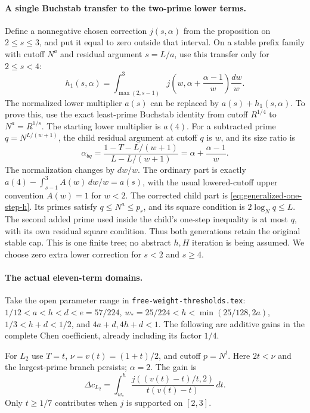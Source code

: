 \documentclass[11pt]{article}
\begin{document}
\paragraph{A single Buchstab transfer to the two-prime lower terms.}
Define a nonnegative chosen correction $j(s,\alpha)$ from the
proposition on $2\le s\le3$, and put it equal to zero outside that
interval. On a stable prefix family with cutoff $N^a$ and residual
argument $s=L/a$, use this transfer only for $2\le s<4$:
\begin{equation}\label{eq:generalized-one-step-h}
 h_1(s,\alpha)=\int_{\max(2,s-1)}^3
 j\left(w,\alpha+\frac{\alpha-1}{w}\right)\frac{dw}{w}.
\end{equation}
The normalized lower multiplier $a(s)$ can be replaced by
$a(s)+h_1(s,\alpha)$. To prove this, use the exact least-prime
Buchstab identity from cutoff $R^{1/4}$ to $N^a=R^{1/s}$.
The starting lower multiplier is $a(4)$. For a subtracted prime
$q=N^{L/(w+1)}$, the child residual argument at cutoff $q$ is $w$,
and its size ratio is
\[
 \alpha_{bq}=\frac{1-T-L/(w+1)}{L-L/(w+1)}
            =\alpha+\frac{\alpha-1}{w}.
\]
The normalization changes by $dw/w$. The ordinary part is exactly
$a(4)-\int_{s-1}^3 A(w)\,dw/w=a(s)$, with the usual lowered-cutoff
upper convention $A(w)=1$ for $w<2$. The corrected child part is
\eqref{eq:generalized-one-step-h}. Its primes satisfy
$q\le N^a\le p_r$, and its square condition is $2\log_Nq\le L$.
The second added prime used inside the child's one-step inequality
is at most $q$, with its own residual square condition. Thus both
generations retain the original stable cap. This is one finite tree;
no abstract $h,H$ iteration is being assumed. We choose zero extra
lower correction for $s<2$ and $s\ge4$.

\paragraph{The actual eleven-term domains.}
Take the open parameter range in \texttt{free-weight-thresholds.tex}:
$1/12<a<h<d<e=57/224$, $w_*=25/224<h<\min(25/128,2a)$,
$1/3<h+d<1/2$, and $4a+d,4h+d<1$.
The following are additive gains in the complete Chen coefficient,
already including its factor $1/4$.

For $L_2$ use $T=t$, $\nu=v(t)=(1+t)/2$, and cutoff $p=N^t$.
Here $2t<\nu$ and the largest-prime branch persists; $\alpha=2$.
The gain is
\[
 \Delta c_{L_2}=\int_{w_*}^h
 \frac{j((v(t)-t)/t,2)}{t(v(t)-t)}\,dt.
\]
Only $t\ge1/7$ contributes when $j$ is supported on $[2,3]$.
\end{document}
